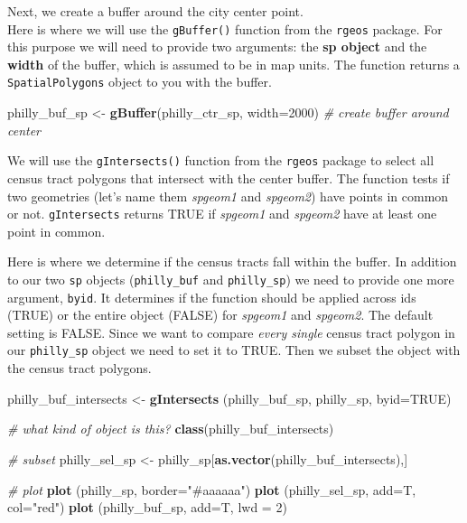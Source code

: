 \documentclass[]{book}
\newenvironment{Shaded}{\begin{snugshade}}{\end{snugshade}}
\newcommand{\KeywordTok}[1]{\textcolor[rgb]{0.13,0.29,0.53}{\textbf{#1}}}
\newcommand{\DataTypeTok}[1]{\textcolor[rgb]{0.13,0.29,0.53}{#1}}
\newcommand{\DecValTok}[1]{\textcolor[rgb]{0.00,0.00,0.81}{#1}}
\newcommand{\StringTok}[1]{\textcolor[rgb]{0.31,0.60,0.02}{#1}}
\newcommand{\CommentTok}[1]{\textcolor[rgb]{0.56,0.35,0.01}{\textit{#1}}}
\newcommand{\OtherTok}[1]{\textcolor[rgb]{0.56,0.35,0.01}{#1}}
\newcommand{\NormalTok}[1]{#1}
\begin{document}
Next, we create a buffer around the city center point.\\
Here is where we will use the \texttt{gBuffer()} function from the
\texttt{rgeos} package. For this purpose we will need to provide two
arguments: the \textbf{sp object} and the \textbf{width} of the buffer,
which is assumed to be in map units. The function returns a
\texttt{SpatialPolygons} object to you with the buffer.

\begin{Shaded}
\begin{Highlighting}[]
\NormalTok{philly_buf_sp <-}\StringTok{ }\KeywordTok{gBuffer}\NormalTok{(philly_ctr_sp, }\DataTypeTok{width=}\DecValTok{2000}\NormalTok{)  }\CommentTok{# create buffer around center}
\end{Highlighting}
\end{Shaded}

We will use the \texttt{gIntersects()} function from the \texttt{rgeos}
package to select all census tract polygons that intersect with the
center buffer. The function tests if two geometries (let's name them
\emph{spgeom1} and \emph{spgeom2}) have points in common or not.
\texttt{gIntersects} returns TRUE if \emph{spgeom1} and \emph{spgeom2}
have at least one point in common.

Here is where we determine if the census tracts fall within the buffer.
In addition to our two \texttt{sp} objects (\texttt{philly\_buf} and
\texttt{philly\_sp}) we need to provide one more argument,
\texttt{byid}. It determines if the function should be applied across
ids (TRUE) or the entire object (FALSE) for \emph{spgeom1} and
\emph{spgeom2}. The default setting is FALSE. Since we want to compare
\emph{every single} census tract polygon in our \texttt{philly\_sp}
object we need to set it to TRUE. Then we subset the object with the
census tract polygons.

\begin{Shaded}
\begin{Highlighting}[]
\NormalTok{philly_buf_intersects <-}\StringTok{  }\KeywordTok{gIntersects}\NormalTok{ (philly_buf_sp, philly_sp, }\DataTypeTok{byid=}\OtherTok{TRUE}\NormalTok{) }

\CommentTok{# what kind of object is this?}
\KeywordTok{class}\NormalTok{(philly_buf_intersects)}

\CommentTok{# subset}
\NormalTok{philly_sel_sp <-}\StringTok{ }\NormalTok{philly_sp[}\KeywordTok{as.vector}\NormalTok{(philly_buf_intersects),]}

\CommentTok{# plot}
\KeywordTok{plot}\NormalTok{ (philly_sp, }\DataTypeTok{border=}\StringTok{"#aaaaaa"}\NormalTok{)}
\KeywordTok{plot}\NormalTok{ (philly_sel_sp, }\DataTypeTok{add=}\NormalTok{T, }\DataTypeTok{col=}\StringTok{"red"}\NormalTok{) }
\KeywordTok{plot}\NormalTok{ (philly_buf_sp, }\DataTypeTok{add=}\NormalTok{T, }\DataTypeTok{lwd =} \DecValTok{2}\NormalTok{)}
\end{Highlighting}
\end{Shaded}
\end{document}
